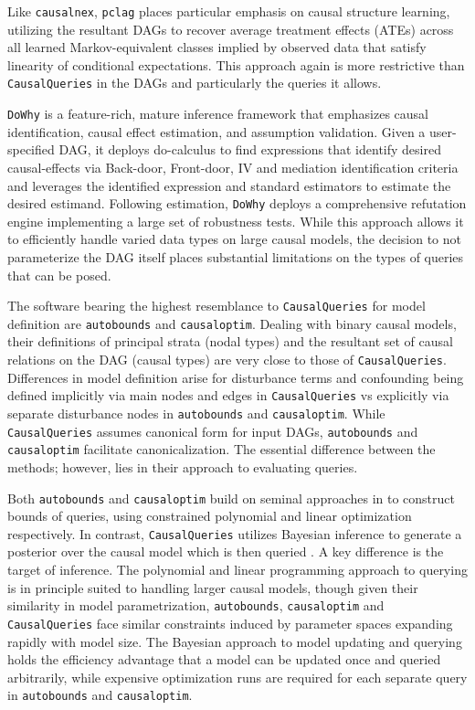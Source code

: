 \documentclass[
  11pt,
  article]{jss}
\begin{document}
Like \texttt{causalnex}, \texttt{pclag} places particular emphasis on
causal structure learning, utilizing the resultant DAGs to recover
average treatment effects (ATEs) across all learned Markov-equivalent
classes implied by observed data that satisfy linearity of conditional
expectations. This approach again is more restrictive than
\texttt{CausalQueries} in the DAGs and particularly the queries it
allows.

\texttt{DoWhy} is a feature-rich, mature inference framework that
emphasizes causal identification, causal effect estimation, and
assumption validation. Given a user-specified DAG, it deploys
do-calculus to find expressions that identify desired causal-effects via
Back-door, Front-door, IV and mediation identification criteria and
leverages the identified expression and standard estimators to estimate
the desired estimand. Following estimation, \texttt{DoWhy} deploys a
comprehensive refutation engine implementing a large set of robustness
tests. While this approach allows it to efficiently handle varied data
types on large causal models, the decision to not parameterize the DAG
itself places substantial limitations on the types of queries that can
be posed.

The software bearing the highest resemblance to \texttt{CausalQueries}
for model definition are \texttt{autobounds} and \texttt{causaloptim}.
Dealing with binary causal models, their definitions of principal strata
(nodal types) and the resultant set of causal relations on the DAG
(causal types) are very close to those of \texttt{CausalQueries}.
Differences in model definition arise for disturbance terms and
confounding being defined implicitly via main nodes and edges in
\texttt{CausalQueries} vs explicitly via separate disturbance nodes in
\texttt{autobounds} and \texttt{causaloptim}. While
\texttt{CausalQueries} assumes canonical form for input DAGs,
\texttt{autobounds} and \texttt{causaloptim} facilitate
canonicalization. The essential difference between the methods; however,
lies in their approach to evaluating queries.

Both \texttt{autobounds} and \texttt{causaloptim} build on seminal
approaches in \citet{balke_bounds_1997} to construct bounds of queries,
using constrained polynomial and linear optimization respectively. In
contrast, \texttt{CausalQueries} utilizes Bayesian inference to generate
a posterior over the causal model which is then queried
\citep[consistent
with][]{chickering_clinicians_1996, zhang_partial_2022}. A key
difference is the target of inference. The polynomial and linear
programming approach to querying is in principle suited to handling
larger causal models, though given their similarity in model
parametrization, \texttt{autobounds}, \texttt{causaloptim} and
\texttt{CausalQueries} face similar constraints induced by parameter
spaces expanding rapidly with model size. The Bayesian approach to model
updating and querying holds the efficiency advantage that a model can be
updated once and queried arbitrarily, while expensive optimization runs
are required for each separate query in \texttt{autobounds} and
\texttt{causaloptim}.
\end{document}
